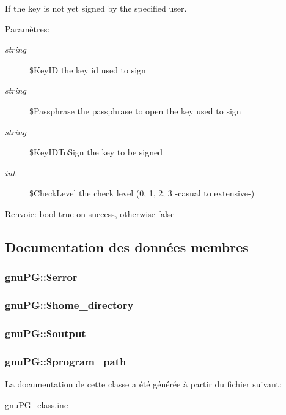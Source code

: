 If the key is not yet signed by the specified user.

\begin{Desc}
\item[Param\`{e}tres:]
\begin{description}
\item[{\em string}]\$Key\-ID the key id used to sign \item[{\em string}]\$Passphrase the passphrase to open the key used to sign \item[{\em string}]\$Key\-IDTo\-Sign the key to be signed \item[{\em int}]\$Check\-Level the check level (0, 1, 2, 3 -casual to extensive-) \end{description}
\end{Desc}
\begin{Desc}
\item[Renvoie:]bool true on success, otherwise false\end{Desc}


\subsection{Documentation des donn\'{e}es membres}
\hypertarget{classgnuPG_o2}{
\subsubsection[\$error]{\setlength{\rightskip}{0pt plus 5cm}gnu\-PG::\$error}}
\label{classgnuPG_o2}


\hypertarget{classgnuPG_o1}{
\subsubsection[\$home\_\-directory]{\setlength{\rightskip}{0pt plus 5cm}gnu\-PG::\$home\_\-directory}}
\label{classgnuPG_o1}


\hypertarget{classgnuPG_o3}{
\subsubsection[\$output]{\setlength{\rightskip}{0pt plus 5cm}gnu\-PG::\$output}}
\label{classgnuPG_o3}


\hypertarget{classgnuPG_o0}{
\subsubsection[\$program\_\-path]{\setlength{\rightskip}{0pt plus 5cm}gnu\-PG::\$program\_\-path}}
\label{classgnuPG_o0}




La documentation de cette classe a \'{e}t\'{e} g\'{e}n\'{e}r\'{e}e \`{a} partir du fichier suivant:\begin{CompactItemize}
\item 
\hyperlink{gnuPG__class_8inc}{gnu\-PG\_\-class.inc}\end{CompactItemize}
